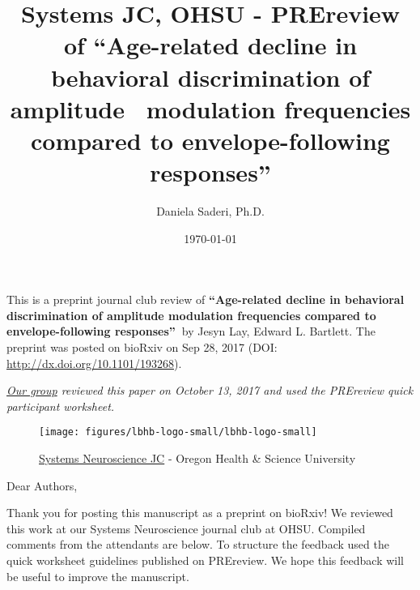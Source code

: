 \documentclass[10pt]{article}
\renewenvironment{abstract}
  {{\bfseries\noindent{\abstractname}\par\nobreak}\footnotesize}
  {\bigskip}
\begin{document}
\title{Systems JC, OHSU - PREreview of ``Age-related decline in behavioral
discrimination of amplitude~ modulation frequencies compared to
envelope-following responses''}



\author[1]{Daniela Saderi, Ph.D.}%
%


\vspace{-1em}



  \date{\today}


\begingroup
\let\center\flushleft
\let\endcenter\endflushleft
\maketitle
\endgroup





\begin{abstract}
This is a preprint journal club review of \textbf{``Age-related decline
in behavioral discrimination of amplitude modulation frequencies
compared to envelope-following responses''~}by Jesyn Lay, Edward L.
Bartlett. The preprint was posted on bioRxiv on Sep 28, 2017 (DOI:
\url{http://dx.doi.org/10.1101/193268}).

\emph{\href{https://hearingbrain.org/systemsjournalclub.php}{Our group}
reviewed this paper on October 13, 2017 and used the PREreview quick
participant worksheet.}%
\end{abstract}%




\begin{figure}[h!]
\begin{center}
\texttt{[image: figures/lbhb-logo-small/lbhb-logo-small]}
\caption{{\href{https://hearingbrain.org/systemsjournalclub.php}{Systems
Neuroscience JC} - Oregon Health \& Science University
{\label{267279}}%
}}
\end{center}
\end{figure}

Dear Authors,

Thank you for posting this manuscript as a preprint on bioRxiv! We
reviewed this work at our Systems Neuroscience journal club at OHSU.
Compiled comments from the attendants are below. To structure the
feedback used the quick worksheet guidelines published on PREreview. We
hope this feedback will be useful to improve the manuscript.
\end{document}
